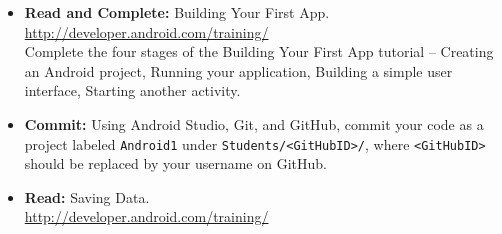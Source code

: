 \documentclass[11pt]{article}
\begin{document}
\begin{itemize}
\item \textbf{Read and Complete:} Building Your First App.\\
\url{http://developer.android.com/training/} \\
Complete the four stages of the Building Your First App tutorial -- Creating an Android project, Running your application, Building a simple user interface, Starting another activity.
\item \textbf{Commit:} Using Android Studio, Git, and GitHub, commit your code as a project labeled \texttt{Android1} under \texttt{Students/<GitHubID>/}, where \texttt{<GitHubID>} should be replaced by your username on GitHub.
\item \textbf{Read:} Saving Data.\\
\url{http://developer.android.com/training/}
\end{itemize}
\end{document}
